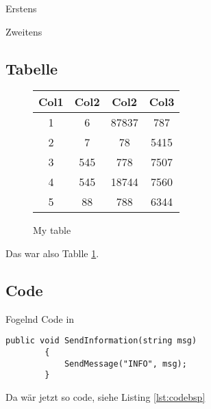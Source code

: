 \begin{description}
    \item Erstens
    \item Zweitens
\end{description}

\subsection{Tabelle}
\begin{figure}[!h]
    \centering
  \begin{tabular}{| c | c | c | c |}
    \hline
    Col1 & Col2 & Col2 & Col3 \\ [0.5ex]
    \hline\hline
    1 & 6 & 87837 & 787 \\
    \hline
    2 & 7 & 78 & 5415 \\
    \hline
    3 & 545 & 778 & 7507 \\
    \hline
    4 & 545 & 18744 & 7560 \\
    \hline
    5 & 88 & 788 & 6344 \\ [1ex]
    \hline
  \end{tabular}
  \label{tab:tabbsp}
  \caption{My table}
\end{figure}
Das war also Tablle \ref{tab:tabbsp}.

\subsection{Code}
Fogelnd Code in \Csharp
\lstset{style=sharpc}
\begin{lstlisting}[caption={My Caption}, captionpos=b, label={lst:codebsp}]
        public void SendInformation(string msg)
        {
            SendMessage("INFO", msg);
        }
\end{lstlisting}
Da wär jetzt so code, siehe Listing \ref{lst:codebsp}
